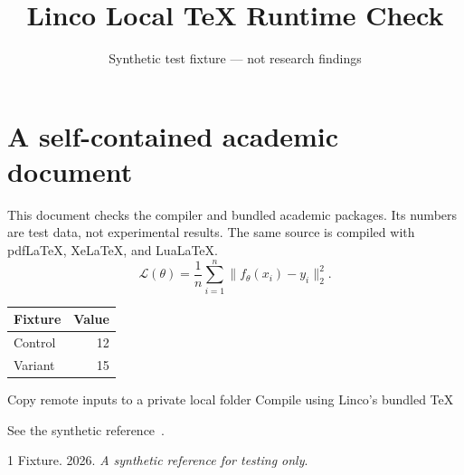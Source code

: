 \documentclass{article}
\title{Linco Local TeX Runtime Check}
\author{Synthetic test fixture --- not research findings}
\date{}
\begin{document}
\maketitle
\section{A self-contained academic document}
This document checks the compiler and bundled academic packages. Its numbers
are test data, not experimental results. The same source is compiled with
pdfLaTeX, XeLaTeX, and LuaLaTeX.
\begin{equation}
  \mathcal{L}(\theta) = \frac{1}{n}\sum_{i=1}^{n}
    \lVert f_\theta(x_i) - y_i \rVert_2^2.
\end{equation}
\begin{center}
\begin{tabular}{lr}
\toprule
Fixture & Value \\
\midrule
Control & 12 \\
Variant & 15 \\
\bottomrule
\end{tabular}
\end{center}
\begin{algorithm}[h]
Copy remote inputs to a private local folder\;
Compile using Linco's bundled TeX\;
\caption{Local compilation of remote source files}
\end{algorithm}
See the synthetic reference~\citep{fixture}.
\begin{thebibliography}{1}
Fixture. 2026. \emph{A synthetic reference for testing only}.
\end{thebibliography}
\end{document}
